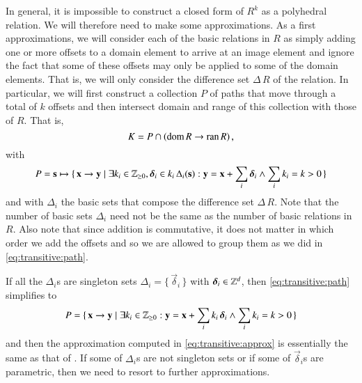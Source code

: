 In general, it is impossible to construct a closed form
of $R^k$ as a polyhedral relation.
We will therefore need to make some approximations.
As a first approximations, we will consider each of the basic
relations in $R$ as simply adding one or more offsets to a domain element
to arrive at an image element and ignore the fact that some of these
offsets may only be applied to some of the domain elements.
That is, we will only consider the difference set $\Delta\,R$ of the relation.
In particular, we will first construct a collection $P$ of paths
that move through
a total of $k$ offsets and then intersect domain and range of this
collection with those of $R$.
That is, 
\begin{equation}
\label{eq:transitive:approx}
K = P \cap \left(\mathop{\rm dom}\nolimits R \to \mathop{\rm ran}\nolimits R\right)
,
\end{equation}
with
\begin{equation}
\label{eq:transitive:path}
P = \vec s \mapsto \{\, \vec x \to \vec y \mid
\exists k_i \in \Z_{\ge 0}, \vec\delta_i \in k_i \, \Delta_i(\vec s) :
\vec y = \vec x + \sum_i \vec\delta_i
\wedge
\sum_i k_i = k > 0
\,\}
\end{equation}
and with $\Delta_i$ the basic sets that compose
the difference set $\Delta\,R$.
Note that the number of basic sets $\Delta_i$ need not be
the same as the number of basic relations in $R$.
Also note that since addition is commutative, it does not
matter in which order we add the offsets and so we are allowed
to group them as we did in \eqref{eq:transitive:path}.

If all the $\Delta_i$s are singleton sets
$\Delta_i = \{\, \vec \delta_i \,\}$ with $\vec \delta_i \in \Z^d$,
then \eqref{eq:transitive:path} simplifies to
\begin{equation}
\label{eq:transitive:singleton}
P = \{\, \vec x \to \vec y \mid
\exists k_i \in \Z_{\ge 0} :
\vec y = \vec x + \sum_i k_i \, \vec \delta_i
\wedge
\sum_i k_i = k > 0
\,\}
\end{equation}
and then the approximation computed in \eqref{eq:transitive:approx}
is essentially the same as that of .
If some of $\Delta_i$s are not singleton sets or if
some of $\vec \delta_i$s are parametric, then we need
to resort to further approximations.

